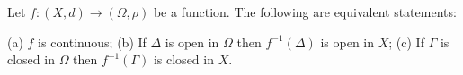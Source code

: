 Let $f: (X, d) \rightarrow (\Omega, \rho)$ be a function. The following are equivalent statements:

(a) $f$ is continuous;
(b) If $\Delta$ is open in $\Omega$ then $f^{-1}(\Delta)$ is open in $X$;
(c) If $\Gamma$ is closed in $\Omega$ then $f^{-1}(\Gamma)$ is closed in $X$.